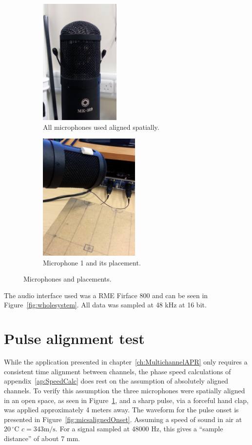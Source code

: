 \begin{figure}
\centering
\begin{subfigure}{.5\textwidth}
  \centering
  \includegraphics[width=4cm]{micsAlign}%
  \caption{All microphones used aligned spatially.}
  \label{fig:micsaligned}
\end{subfigure}%
\begin{subfigure}{.5\textwidth}
  \centering
  \includegraphics[width=5cm]{mic1}%
  \caption{Microphone 1 and its placement.}
  \label{fig:mic1}
\end{subfigure}
\caption{Microphones and placements.}
\label{fig:mic123}
\end{figure}

The audio interface used was a RME Firface 800 and can be seen in Figure~\ref{fig:wholesystem}. All data was sampled at 48 kHz at 16 bit.

\section{Pulse alignment test}\label{sec:MultiAPRsystemAligntest}
While the application presented in chapter~\ref{ch:MultichannelAPR} only requires a consistent time alignment between channels, the phase speed calculations of appendix~\ref{ap:SpeedCalc} does rest on the assumption of absolutely aligned channels. To verify this assumption the three microphones were spatially aligned in an open space, as seen in Figure~\ref{fig:micsaligned}, and a sharp pulse, via a forceful hand clap, was applied approximately 4 meters away. The waveform for the pulse onset is presented in Figure~\ref{fig:micsalignedOnset}. Assuming a speed of sound in air at $20\,^{\circ}\mathrm{C}$ $c = 343 \mathrm{m}/\mathrm{s}$. For a signal sampled at 48000 Hz, this gives a ``sample distance'' of about 7 mm.

